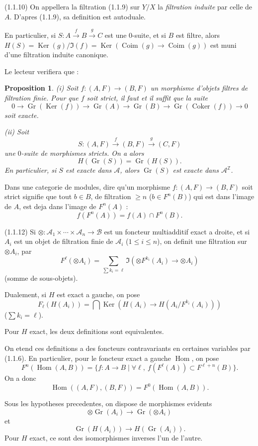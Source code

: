 \documentclass[11pt,a4paper]{amsart}
\theoremstyle{plain}
\newtheorem{proposition}[theorem]{Proposition}
\theoremstyle{definition}
\theoremstyle{remark}
\DeclareMathOperator{\Gr}{Gr}
\DeclareMathOperator{\Ker}{Ker}
\DeclareMathOperator{\Coker}{Coker}
\DeclareMathOperator{\Coim}{Coim}
\DeclareMathOperator{\Hom}{Hom}
\newcommand{\sA}{\mathscr{A}}
\newcommand{\sB}{\mathscr{B}}
\newcommand{\bZ}{\mathbb{Z}}
\numberwithin{equation}{subsection}
\begin{document}
(1.1.10) On appellera la filtration (1.1.9) sur $Y/X$ la \emph{filtration induite} par celle
de $A$. D'apres (1.1.9), sa definition est autoduale.

En particulier, si $S : A \xrightarrow{f} B \xrightarrow{g} C$ est une $0$-suite, et si $B$ est filtre, alors
$H(S) = \Ker(g)/\Im(f) = \Ker(\Coim(g) \to \Coim(g))$ est muni d'une filtration induite
canonique.

Le lecteur verifiera que :

\begin{proposition}\label{prop:1.1.11}
\textup{(i)} Soit $f : (A, F) \to (B, F)$ un morphisme d'objets filtres de filtration finie. Pour que $f$ soit strict, il faut et il suffit que la suite
\[
0 \to \Gr(\Ker(f)) \to \Gr(A) \to \Gr(B) \to \Gr(\Coker(f)) \to 0
\]
soit exacte.

\textup{(ii)} Soit
\[
S : (A, F) \xrightarrow{f} (B, F) \xrightarrow{g} (C, F)
\]
une $0$-suite de morphismes stricts. On a alors
\[
H(\Gr(S)) = \Gr(H(S)).
\]
En particulier, si $S$ est exacte dans $\sA$, alors $\Gr(S)$ est exacte dans $\sA^{\bZ}$.
\end{proposition}

Dans une categorie de modules, dire qu'un morphisme $f : (A, F) \to (B, F)$ soit strict
signifie que tout $b \in B$, de filtration $\geqslant n$ ($b \in F^n(B)$) qui est dans l'image de $A$, est deja
dans l'image de $F^n(A)$ :
\[
f(F^n(A)) = f(A) \cap F^n(B).
\]

(1.1.12) Si $\otimes : \sA_1 \times \cdots \times \sA_n \to \sB$ est un foncteur multiadditif exact a droite,
et si $A_i$ est un objet de filtration finie de $\sA_i$ ($1 \leqslant i \leqslant n$), on definit une filtration sur $\otimes A_i$,
par
\[
F^{\ell}(\otimes A_i) = \sum_{\sum k_i = \ell} \Im(\otimes F^{k_i}(A_i) \to \otimes A_i)
\]
(somme de sous-objets).

Dualement, si $H$ est exact a gauche, on pose
\[
F_{\ell}(H(A_i)) = \bigcap \Ker(H(A_i) \to H(A_i/F^{k_i}(A_i)))
\]
($\sum k_i = \ell$).

Pour $H$ exact, les deux definitions sont equivalentes.

On etend ces definitions a des foncteurs contravariants en certaines variables
par (1.1.6). En particulier, pour le foncteur exact a gauche $\Hom$, on pose
\[
F^n(\Hom(A,B)) = \{f : A \to B \mid \forall \ell,\ f(F^{\ell}(A)) \subset F^{\ell+n}(B)\}.
\]
On a donc
\[
\Hom((A,F),(B,F)) = F^0(\Hom(A,B)).
\]

Sous les hypotheses precedentes, on dispose de morphismes evidents
\[
\otimes \Gr(A_i) \to \Gr(\otimes A_i)
\]
et
\[
\Gr(H(A_i)) \to H(\Gr(A_i)).
\]
Pour $H$ exact, ce sont des isomorphismes inverses l'un de l'autre.
\end{document}
